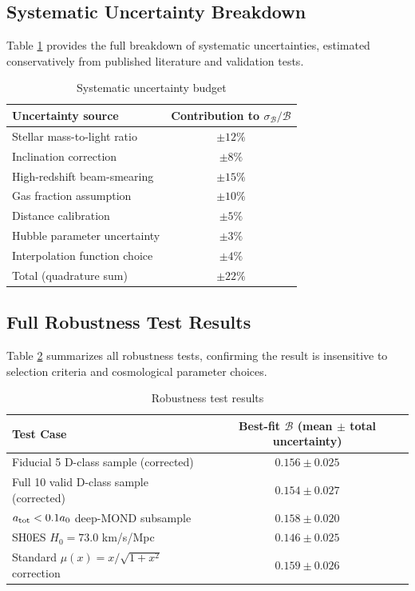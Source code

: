 \documentclass[fleqn,usenatbib]{mnras}
\begin{document}
\subsection{Systematic Uncertainty Breakdown}
Table \ref{tab:systematics} provides the full breakdown of systematic uncertainties, estimated conservatively from published literature and validation tests.

\begin{table}
\noindent
\caption{Systematic uncertainty budget}
\label{tab:systematics}
\small
\begin{tabular}{@{}lc@{}}
\toprule
Uncertainty source & Contribution to $\sigma_{\mathcal{B}}/\mathcal{B}$ \\
\midrule
Stellar mass-to-light ratio & $\pm12\%$ \\
Inclination correction & $\pm8\%$ \\
High-redshift beam-smearing & $\pm15\%$ \\
Gas fraction assumption & $\pm10\%$ \\
Distance calibration & $\pm5\%$ \\
Hubble parameter uncertainty & $\pm3\%$ \\
Interpolation function choice & $\pm4\%$ \\
\midrule
Total (quadrature sum) & $\pm22\%$ \\
\bottomrule
\end{tabular}
\end{table}

\subsection{Full Robustness Test Results}
Table \ref{tab:robustness} summarizes all robustness tests, confirming the result is insensitive to selection criteria and cosmological parameter choices.

\begin{table}
\noindent
\caption{Robustness test results}
\label{tab:robustness}
\small
\begin{tabular}{@{}lc@{}}
\toprule
Test Case & Best-fit $\mathcal{B}$ (mean $\pm$ total uncertainty) \\
\midrule
Fiducial 5 D-class sample (corrected) & $0.156 \pm 0.025$ \\
Full 10 valid D-class sample (corrected) & $0.154 \pm 0.027$ \\
$a_{\rm tot} < 0.1a_0$ deep-MOND subsample & $0.158 \pm 0.020$ \\
SH0ES $H_0 = 73.0$ km/s/Mpc & $0.146 \pm 0.025$ \\
Standard $\mu(x)=x/\sqrt{1+x^2}$ correction & $0.159 \pm 0.026$ \\
\bottomrule
\end{tabular}
\end{table}
\end{document}
